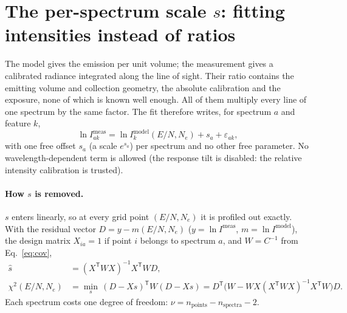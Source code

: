 \documentclass[11pt]{article}
\newcommand{\EN}{E/N}
\begin{document}
\section{The per-spectrum scale $s$: fitting intensities instead of ratios}
\label{sec:s}
The model gives the emission per unit volume; the measurement gives a calibrated radiance integrated along the line
of sight. Their ratio contains the emitting volume and collection geometry, the absolute calibration and the
exposure, none of which is known well enough. All of them multiply every line of one spectrum by the same factor.
The fit therefore writes, for spectrum $a$ and feature $k$,
\begin{equation}
\ln I^{\mathrm{meas}}_{ak} = \ln I^{\mathrm{model}}_k(\EN, N_e) + s_a + \varepsilon_{ak},
\label{eq:s}
\end{equation}
with one free offset $s_a$ (a scale $e^{s_a}$) per spectrum and no other free parameter. No wavelength-dependent
term is allowed (the response tilt is disabled: the relative intensity calibration is trusted).

\paragraph{How $s$ is removed.} $s$ enters linearly, so at every grid point $(\EN, N_e)$ it is profiled out
exactly. With the residual vector $D = y - m(\EN,N_e)$ ($y=\ln I^{\mathrm{meas}}$, $m=\ln I^{\mathrm{model}}$), the
design matrix $X_{ia}=1$ if point $i$ belongs to spectrum $a$, and $W=C^{-1}$ from Eq.~\eqref{eq:cov},
\begin{align}
\hat s &= (X^{\mathsf T} W X)^{-1} X^{\mathsf T} W D , \nonumber\\
\chi^2(\EN, N_e) &= \min_s\,(D - Xs)^{\mathsf T} W (D - Xs)
  = D^{\mathsf T}\big(W - W X (X^{\mathsf T}WX)^{-1}X^{\mathsf T}W\big) D .
\label{eq:chi2}
\end{align}
Each spectrum costs one degree of freedom: $\nu = n_{\mathrm{points}} - n_{\mathrm{spectra}} - 2$.
\end{document}
